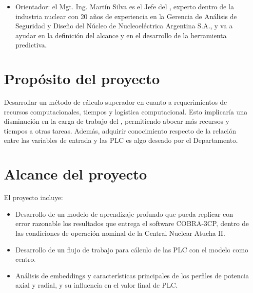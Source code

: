 \documentclass[
11pt, %
]{charter}
\newcommand{\CNA}{Central Nuclear Atucha II}
\begin{document}
\begin{itemize}
  \item Orientador: el Mgt. Ing. Martín Silva es el Jefe del \clientename{}, experto dentro de la industria nuclear con 20 años de experiencia en la Gerencia de Análisis de Seguridad y Diseño del Núcleo de Nucleoeléctrica Argentina S.A., y va a ayudar en la definición del alcance y en el desarrollo de la herramienta predictiva.
\end{itemize}

\section{Propósito del proyecto}
\label{sec:proposito}

Desarrollar un método de cálculo superador en cuanto a requerimientos de recursos computacionales, tiempos y logística computacional. Esto implicaría una disminución en la carga de trabajo del \clientename{}, permitiendo abocar más recursos y tiempos a otras tareas. Además, adquirir conocimiento respecto de la relación entre las variables de entrada y las PLC es algo deseado por el Departamento.

\section{Alcance del proyecto}
\label{sec:alcance}

El proyecto incluye:
\begin{itemize}
  \item Desarrollo de un modelo de aprendizaje profundo que pueda replicar con error razonable los resultados que entrega el software COBRA-3CP, dentro de las condiciones de operación nominal de la \CNA{}.
  \item Desarrollo de un flujo de trabajo para cálculo de las PLC con el modelo como centro.
  \item Análisis de embeddings y características principales de los perfiles de potencia axial y radial, y su influencia en el valor final de PLC.
\end{itemize}
\end{document}
